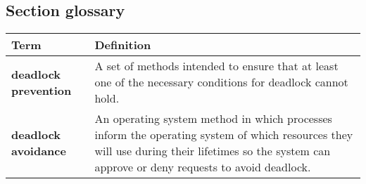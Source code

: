 \subsection*{Section glossary}
\begin{tabular}{p{}p{}}
    \toprule
    \textbf{Term} & \textbf{Definition} \\
    \midrule
    \textbf{deadlock prevention} & A set of methods intended to ensure that at least one of the necessary conditions for deadlock cannot hold. \\
    \textbf{deadlock avoidance} & An operating system method in which processes inform the operating system of which resources they will use during their lifetimes so the system can approve or deny requests to avoid deadlock. \\
    \bottomrule
\end{tabular}

